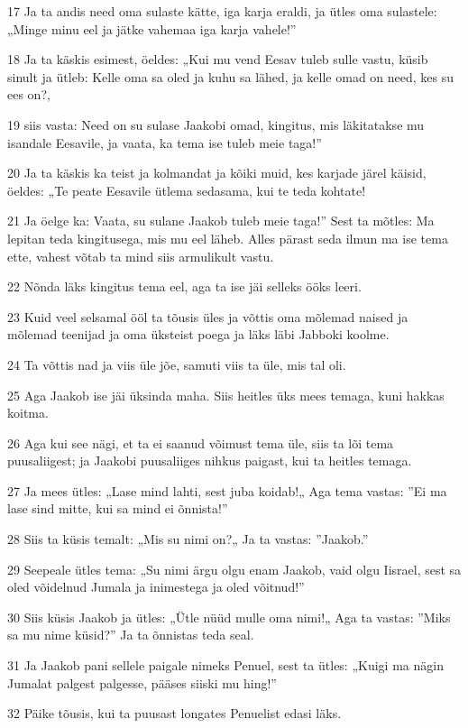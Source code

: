\par 17 Ja ta andis need oma sulaste kätte, iga karja eraldi, ja ütles oma sulastele: „Minge minu eel ja jätke vahemaa iga karja vahele!”
\par 18 Ja ta käskis esimest, öeldes: „Kui mu vend Eesav tuleb sulle vastu, küsib sinult ja ütleb: Kelle oma sa oled ja kuhu sa lähed, ja kelle omad on need, kes su ees on?,
\par 19 siis vasta: Need on su sulase Jaakobi omad, kingitus, mis läkitatakse mu isandale Eesavile, ja vaata, ka tema ise tuleb meie taga!”
\par 20 Ja ta käskis ka teist ja kolmandat ja kõiki muid, kes karjade järel käisid, öeldes: „Te peate Eesavile ütlema sedasama, kui te teda kohtate!
\par 21 Ja öelge ka: Vaata, su sulane Jaakob tuleb meie taga!” Sest ta mõtles: Ma lepitan teda kingitusega, mis mu eel läheb. Alles pärast seda ilmun ma ise tema ette, vahest võtab ta mind siis armulikult vastu.
\par 22 Nõnda läks kingitus tema eel, aga ta ise jäi selleks ööks leeri.
\par 23 Kuid veel selsamal ööl ta tõusis üles ja võttis oma mõlemad naised ja mõlemad teenijad ja oma üksteist poega ja läks läbi Jabboki koolme.
\par 24 Ta võttis nad ja viis üle jõe, samuti viis ta üle, mis tal oli.
\par 25 Aga Jaakob ise jäi üksinda maha. Siis heitles üks mees temaga, kuni hakkas koitma.
\par 26 Aga kui see nägi, et ta ei saanud võimust tema üle, siis ta lõi tema puusaliigest; ja Jaakobi puusaliiges nihkus paigast, kui ta heitles temaga.
\par 27 Ja mees ütles: „Lase mind lahti, sest juba koidab!„ Aga tema vastas: ”Ei ma lase sind mitte, kui sa mind ei õnnista!”
\par 28 Siis ta küsis temalt: „Mis su nimi on?„ Ja ta vastas: ”Jaakob.”
\par 29 Seepeale ütles tema: „Su nimi ärgu olgu enam Jaakob, vaid olgu Iisrael, sest sa oled võidelnud Jumala ja inimestega ja oled võitnud!”
\par 30 Siis küsis Jaakob ja ütles: „Ütle nüüd mulle oma nimi!„ Aga ta vastas: ”Miks sa mu nime küsid?” Ja ta õnnistas teda seal.
\par 31 Ja Jaakob pani sellele paigale nimeks Penuel, sest ta ütles: „Kuigi ma nägin Jumalat palgest palgesse, pääses siiski mu hing!”
\par 32 Päike tõusis, kui ta puusast longates Penuelist edasi läks.

